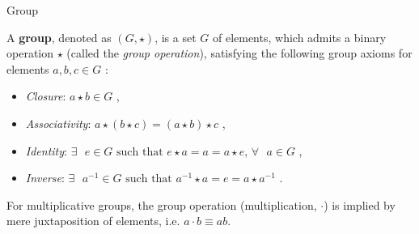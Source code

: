 \documentclass{beamer}
\newcommand\boldtext[1]{\textcolor{bolds}{\textbf{#1}}}
\newcommand\italictext[1]{\textcolor{italics}{\textit{#1}}}
\begin{document}
\begin{frame}{Group}
    \begin{definition}
        A \boldtext{group}, denoted as $(G,\star )$, is a set $G$ of elements, which admits a binary operation $\star$ (called the \italictext{group operation}), satisfying the following group axioms for elements $a, b, c \in G$ :
        \begin{itemize}
            \item \italictext{Closure}: $a\star b\in G$ ,
            \item \italictext{Associativity}: $a\star(b\star c)=(a\star b)\star c$ ,
            \item \italictext{Identity}: $\exists \text{ } e\in G \text{ such that } e\star a=a=a\star e \text{,  } \forall \text{ } a\in G$ ,
            \item \italictext{Inverse}: $\exists \text{ } a^{-1}\in G \text{ such that } a^{-1}\star a=e=a\star a^{-1}$ .
        \end{itemize}
    \end{definition}
    For multiplicative groups, the group operation (multiplication, $\cdot$) is implied by mere juxtaposition of elements, i.e. $a\cdot b\equiv ab$.
\end{frame}
\end{document}
